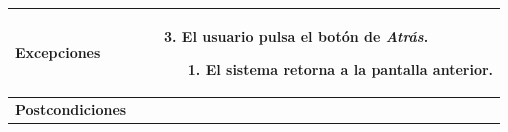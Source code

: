 \begin{longtable}{| p{4cm} | p{10cm} |}
\\
\hline
\textbf{Excepciones} &\mbox{}\par\vspace{-\baselineskip}
\begin{enumerate}[leftmargin=0.9cm, topsep=0.1cm]
\item[3.] El usuario pulsa el botón de \textit{Atrás}.
	\begin{itemize}
	\item[1.] El sistema retorna a la pantalla anterior.
	\end{itemize}
\end{enumerate}
\\

\hline
\textbf{Postcondiciones} & \\
\hline
\end{longtable}



\newpage
